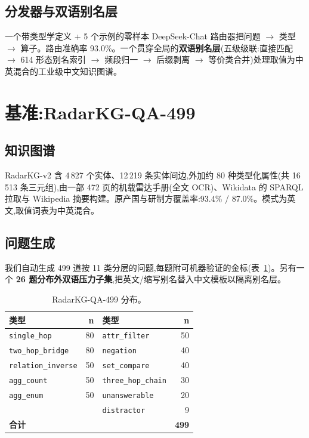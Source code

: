 \documentclass[11pt,a4paper]{article}
\newcommand{\qtype}[1]{\texttt{\small #1}}
\begin{document}
\subsection{分发器与双语别名层}
一个带类型学定义 + 5 个示例的零样本 DeepSeek-Chat 路由器把问题 $\to$ 类型 $\to$ 算子。路由准确率 93.0\%。一个贯穿全局的\textbf{双语别名层}(五级级联:直接匹配 $\to$ 614 形态别名索引 $\to$ 频段归一 $\to$ 后缀剥离 $\to$ 等价类合并)处理取值为中英混合的工业级中文知识图谱。

\section{基准:RadarKG-QA-499}
\label{sec:benchmark}

\subsection{知识图谱}
RadarKG-v2 含 4\,827 个实体、12\,219 条实体间边,外加约 80 种类型化属性(共 16\,513 条三元组),由一部 472 页的机载雷达手册(全文 OCR)、Wikidata 的 SPARQL 拉取与 Wikipedia 摘要构建。原产国与研制方覆盖率:93.4\% / 87.0\%。模式为英文,取值词表为中英混合。

\subsection{问题生成}
我们自动生成 499 道按 11 类分层的问题,每题附可机器验证的金标(表~\ref{tab:qa-dist})。另有一个 \textbf{26 题分布外双语压力子集},把英文/缩写别名替入中文模板以隔离别名层。

\begin{table}[h]
\centering\small
\caption{RadarKG-QA-499 分布。}
\label{tab:qa-dist}
\begin{tabular}{l r l r}
\toprule
\textbf{类型} & \textbf{n} & \textbf{类型} & \textbf{n} \\
\midrule
\qtype{single\_hop}        & 80 & \qtype{attr\_filter}      & 50 \\
\qtype{two\_hop\_bridge}   & 80 & \qtype{negation}          & 40 \\
\qtype{relation\_inverse}  & 50 & \qtype{set\_compare}      & 40 \\
\qtype{agg\_count}         & 50 & \qtype{three\_hop\_chain} & 30 \\
\qtype{agg\_enum}          & 50 & \qtype{unanswerable}      & 20 \\
                           &    & \qtype{distractor}        & 9  \\
\midrule
\multicolumn{3}{l}{\textbf{合计}} & \textbf{499} \\
\bottomrule
\end{tabular}
\end{table}
\end{document}
